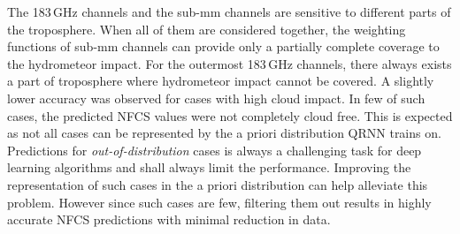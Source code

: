 \documentclass[amt, manuscript]{copernicus}
\begin{document}
The 183\,GHz channels and the sub-mm channels are sensitive to different parts of the troposphere. When all of them are considered together, the weighting functions of sub-mm channels can provide only a partially complete coverage to the hydrometeor impact. For the outermost 183\,GHz channels, there always exists a part of troposphere where hydrometeor impact cannot be covered.  A slightly lower accuracy was observed for cases with high cloud impact. In few of such cases, the predicted NFCS values were not completely cloud free. This is expected as not all cases can be represented by the a priori distribution QRNN trains on. Predictions for \textit{out-of-distribution} cases is always a challenging task for deep learning algorithms and  shall always limit the performance. Improving the representation of such cases in the a priori distribution can help alleviate this problem. However since such cases are few, filtering them out results in highly accurate NFCS predictions with minimal reduction in data.

 














\appendix
\section{}    %

\subsection{}     %
\end{document}
